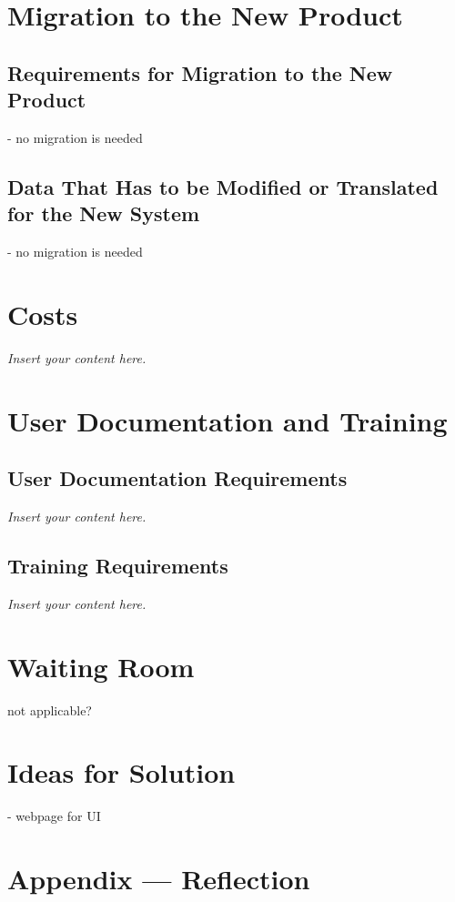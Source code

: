 \documentclass[12pt]{article}
\newcommand{\lips}{\textit{Insert your content here.}}
\begin{document}
\section{Migration to the New Product}
\subsection{Requirements for Migration to the New Product}

- no migration is needed

\subsection{Data That Has to be Modified or Translated for the New System}

- no migration is needed

\section{Costs}
\lips
\section{User Documentation and Training}
\subsection{User Documentation Requirements}
\lips
\subsection{Training Requirements}
\lips

\section{Waiting Room}

not applicable?

\section{Ideas for Solution}

- webpage for UI

\newpage{}
\section*{Appendix --- Reflection}




\end{document}
